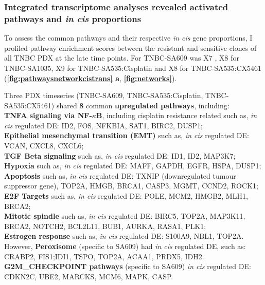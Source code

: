 \subsubsection{Integrated transcriptome analyses revealed  activated pathways and \textit{in cis} proportions}
To assess the common pathways and their respective  \textit{in cis} gene  proportions, I profiled pathway enrichment scores between the resistant and sensitive clones of all TNBC PDX at the late time points. For TNBC-SA609 was X7 , X8 for TNBC-SA1035, X9 for TNBC-SA535:Cisplatin and X8 for TNBC-SA535:CX5461 (\textbf{\autoref{fig:pathwaysnetworkcistrans} a}, \textbf{\autoref{fig:networks}}). 



Three PDX timeseries (TNBC-SA609, TNBC-SA535:Cisplatin, TNBC-SA535:CX5461) shared \textbf{8} common \textbf{upregulated pathways}, including:
\\
\textbf{TNFA signaling via NF-$\kappa$B}, including cisplatin resistance related such as, \textit{in cis} regulated DE:
ID2, FOS, NFKBIA, SAT1, BIRC2, DUSP1;
\\
\textbf{Epithelial mesenchymal transition (EMT)} such as, \textit{in cis} regulated DE: VCAN, CXCL8, CXCL6; 
\\
\textbf{TGF Beta signaling} such as, \textit{in cis} regulated DE: ID1, ID2, MAP3K7; 
\\
\textbf{Hypoxia} such as, \textit{in cis} regulated DE: MAFF, GAPDH, EGFR, HSPA, DUSP1;
\\
\textbf{Apoptosis} such as, \textit{in cis} regulated DE: TXNIP (downregulated tumour suppressor gene), TOP2A, HMGB, BRCA1, CASP3, MGMT, CCND2, ROCK1;
\\
 \textbf{E2F Targets} such as, \textit{in cis} regulated DE: POLE, MCM2, HMGB2, MLH1, BRCA2; 
 \\
 \textbf{Mitotic spindle} such as, \textit{in cis} regulated DE: BIRC5, TOP2A, MAP3K11, BRCA2, NOTCH2, BCL2L11, BUB1, AURKA, RASA1, PLK1;
 \\
 \textbf{Estrogen response} such as, \textit{in cis} regulated DE: S100A9, NBL1, TOP2A.
 \\ However, \textbf{Peroxisome} (specific to SA609) had \textit{in cis} regulated DE, such as: CRABP2, FIS1;IDI1, TSPO, TOP2A, ACAA1, PRDX5, IDH2. 
 \\\textbf{G2M\_CHECKPOINT pathways} (specific to SA609) \textit{in cis} regulated DE: CDKN2C, UBE2, MARCKS, MCM6, MAPK, CASP.
 
